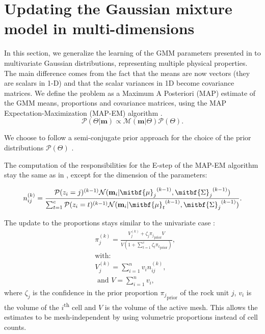 \documentclass[extra, mreferee]{gji_joint} %
\begin{document}
\section{Updating the Gaussian mixture model in multi-dimensions} \label{UpdateTheta}

In this section, we generalize the learning of the GMM parameters presented in \citet{ggz389} to multivariate Gaussian distributions, representing multiple physical properties. The main difference comes from the fact that the means are now vectors (they are scalars in 1-D) and that the scalar variances in 1D become covariance matrices. We define the problem as a Maximum A Posteriori (MAP) estimate of the GMM means, proportions and covariance matrices, using the MAP Expectation-Maximization (MAP-EM) algorithm \citep{ExpectationMaximization}.
\begin{equation}
\mathcal{P}(\Theta|\mathbf{m}) \propto \mathcal{M}(\mathbf{m}|\Theta)\mathcal{P}(\Theta).
\label{theta_posterior}
\end{equation}

We choose to follow a semi-conjugate prior approach for the choice of the prior distributions $\mathcal{P}(\Theta)$ \citep{ggz389, Murphy2012}.

The computation of the responsibilities for the E-step of the MAP-EM algorithm stay the same as in \citet{ggz389}, except for the dimension of the parameters:

\begin{equation}
n_{ij}^{(k)} = \frac{\mathcal{P}(z_i=j)^{(k-1)}\mathcal{N}(\mathbf{m}_i|{\mitbf{\mu}_j}^{(k-1)}, {\mitbf{\Sigma}_j}^{(k-1)})}{ \sum_{t=1}^c \mathcal{P}(z_i=t)^{(k-1)} \mathcal{N}({\mathbf{m}}_i|{\mitbf{\mu}_t}^{(k-1)}, {\mitbf{\Sigma}_j}^{(k-1)})} \label{eq:responsibilities}.
\end{equation}

The update to the proportions stays similar to the univariate case \citep{ggz389}:
\begin{align}
&{\pi}^{(k)}_j = \frac{V_{j}^{(k)}+\zeta_j {{\pi}_j}_{\text{prior}}V}{V(1+\sum_{t=1}^c \zeta_t {{\pi}_t}_{\text{prior}})} \label{eq:pi_update}, \\
&\text{with:} \nonumber\\
&V_{j}^{(k)} = \sum^n_{i=1} v_i n_{ij}^{(k)}, \label{VolumeProportions}\\
&\text{ and } V=\sum^n_{i=1} v_i,
\end{align}
where $\zeta_j$ is the confidence in the prior proportion ${\pi_j}_{\text{prior}}$ of the rock unit $j$, $v_i$ is the volume of the $i$\textsuperscript{th} cell and $V$ is the volume of the
active mesh. This allows the estimates to be mesh-independent by using volumetric proportions instead of cell counts.
\end{document}
